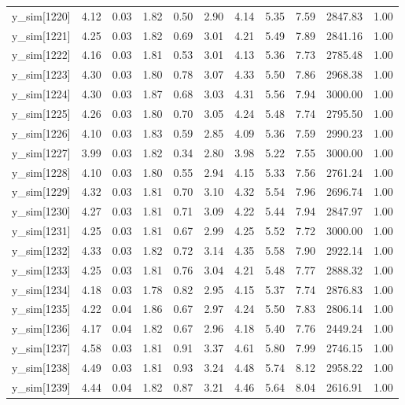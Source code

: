\begin{table}[ht]
\begin{tabular}{rrrrrrrrrrr}
  y\_sim[1220] & 4.12 & 0.03 & 1.82 & 0.50 & 2.90 & 4.14 & 5.35 & 7.59 & 2847.83 & 1.00 \\ 
  y\_sim[1221] & 4.25 & 0.03 & 1.82 & 0.69 & 3.01 & 4.21 & 5.49 & 7.89 & 2841.16 & 1.00 \\ 
  y\_sim[1222] & 4.16 & 0.03 & 1.81 & 0.53 & 3.01 & 4.13 & 5.36 & 7.73 & 2785.48 & 1.00 \\ 
  y\_sim[1223] & 4.30 & 0.03 & 1.80 & 0.78 & 3.07 & 4.33 & 5.50 & 7.86 & 2968.38 & 1.00 \\ 
  y\_sim[1224] & 4.30 & 0.03 & 1.87 & 0.68 & 3.03 & 4.31 & 5.56 & 7.94 & 3000.00 & 1.00 \\ 
  y\_sim[1225] & 4.26 & 0.03 & 1.80 & 0.70 & 3.05 & 4.24 & 5.48 & 7.74 & 2795.50 & 1.00 \\ 
  y\_sim[1226] & 4.10 & 0.03 & 1.83 & 0.59 & 2.85 & 4.09 & 5.36 & 7.59 & 2990.23 & 1.00 \\ 
  y\_sim[1227] & 3.99 & 0.03 & 1.82 & 0.34 & 2.80 & 3.98 & 5.22 & 7.55 & 3000.00 & 1.00 \\ 
  y\_sim[1228] & 4.10 & 0.03 & 1.80 & 0.55 & 2.94 & 4.15 & 5.33 & 7.56 & 2761.24 & 1.00 \\ 
  y\_sim[1229] & 4.32 & 0.03 & 1.81 & 0.70 & 3.10 & 4.32 & 5.54 & 7.96 & 2696.74 & 1.00 \\ 
  y\_sim[1230] & 4.27 & 0.03 & 1.81 & 0.71 & 3.09 & 4.22 & 5.44 & 7.94 & 2847.97 & 1.00 \\ 
  y\_sim[1231] & 4.25 & 0.03 & 1.81 & 0.67 & 2.99 & 4.25 & 5.52 & 7.72 & 3000.00 & 1.00 \\ 
  y\_sim[1232] & 4.33 & 0.03 & 1.82 & 0.72 & 3.14 & 4.35 & 5.58 & 7.90 & 2922.14 & 1.00 \\ 
  y\_sim[1233] & 4.25 & 0.03 & 1.81 & 0.76 & 3.04 & 4.21 & 5.48 & 7.77 & 2888.32 & 1.00 \\ 
  y\_sim[1234] & 4.18 & 0.03 & 1.78 & 0.82 & 2.95 & 4.15 & 5.37 & 7.74 & 2876.83 & 1.00 \\ 
  y\_sim[1235] & 4.22 & 0.04 & 1.86 & 0.67 & 2.97 & 4.24 & 5.50 & 7.83 & 2806.14 & 1.00 \\ 
  y\_sim[1236] & 4.17 & 0.04 & 1.82 & 0.67 & 2.96 & 4.18 & 5.40 & 7.76 & 2449.24 & 1.00 \\ 
  y\_sim[1237] & 4.58 & 0.03 & 1.81 & 0.91 & 3.37 & 4.61 & 5.80 & 7.99 & 2746.15 & 1.00 \\ 
  y\_sim[1238] & 4.49 & 0.03 & 1.81 & 0.93 & 3.24 & 4.48 & 5.74 & 8.12 & 2958.22 & 1.00 \\ 
  y\_sim[1239] & 4.44 & 0.04 & 1.82 & 0.87 & 3.21 & 4.46 & 5.64 & 8.04 & 2616.91 & 1.00 \\ 

\end{tabular}
\end{table}
